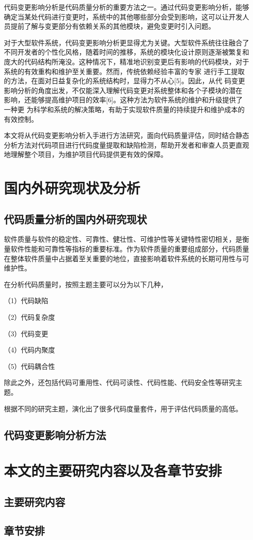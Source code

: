 代码变更影响分析是代码质量分析的重要方法之一。通过代码变更影响分析，能够确定当某处代码进行变更时，系统中的其他哪些部分会受到影响，这可以让开发人员提前了解与变更部分有依赖关系的其他模块，避免变更时引入问题。

对于大型软件系统，代码变更影响分析更显得尤为关键。大型软件系统往往融合了不同开发者的个性化风格，随着时间的推移，系统的模块化设计原则逐渐被繁复和庞大的代码结构所淹没。这种情况下，精准地识别变更后有影响的代码模块，对于系统的有效重构和维护至关重要。然而，传统依赖经验丰富的专家
进行手工提取的方法，在面对日益复杂化的系统结构时，显得力不从心[5]。因此，从代
码变更影响分析的角度出发，不仅能深入理解代码变更对系统整体和各个子模块的潜在
影响，还能够提高维护项目的效率[6]。这种方法为软件系统的维护和升级提供了一种更
为科学和系统的解决策略，有助于实现软件质量的持续提升和维护成本的有效控制。

本文将从代码变更影响分析入手进行方法研究，面向代码质量评估，同时结合静态分析方法对代码项目进行代码度量提取和缺陷检测，帮助开发者和审查人员更直观地理解整个项目，为维护项目代码提供更有效的保障。

\section{国内外研究现状及分析}


\subsection{代码质量分析的国内外研究现状}

软件质量与软件的稳定性、可靠性、健壮性、可维护性等关键特性密切相关，是衡量软件性能和可靠性等指标的重要标准。作为软件质量的重要组成部分，代码质量在整体软件质量中占据着至关重要的地位，直接影响着软件系统的长期可用性与可维护性。

在分析代码质量时，按照主题主要可以分为以下几种，

（1）代码缺陷

（2）代码复杂度

（3）代码变更

（4）代码内聚度

（5）代码耦合性

除此之外，还包括代码可重用性、代码可读性、代码性能、代码安全性等研究主题。

根据不同的研究主题，演化出了很多代码度量套件，用于评估代码质量的高低。


\subsection{代码变更影响分析方法}


\section{本文的主要研究内容以及各章节安排}
\subsection{主要研究内容}
\subsection{章节安排}


